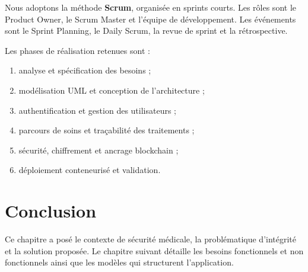 Nous adoptons la méthode \textbf{Scrum}, organisée en sprints courts. Les rôles sont le Product Owner, le Scrum Master et l'équipe de développement. Les événements sont le Sprint Planning, le Daily Scrum, la revue de sprint et la rétrospective.

Les phases de réalisation retenues sont :

\begin{enumerate}
    \item analyse et spécification des besoins ;
    \item modélisation UML et conception de l'architecture ;
    \item authentification et gestion des utilisateurs ;
    \item parcours de soins et traçabilité des traitements ;
    \item sécurité, chiffrement et ancrage blockchain ;
    \item déploiement conteneurisé et validation.
\end{enumerate}

\section{Conclusion}

Ce chapitre a posé le contexte de sécurité médicale, la problématique d'intégrité et la solution proposée. Le chapitre suivant détaille les besoins fonctionnels et non fonctionnels ainsi que les modèles qui structurent l'application.
